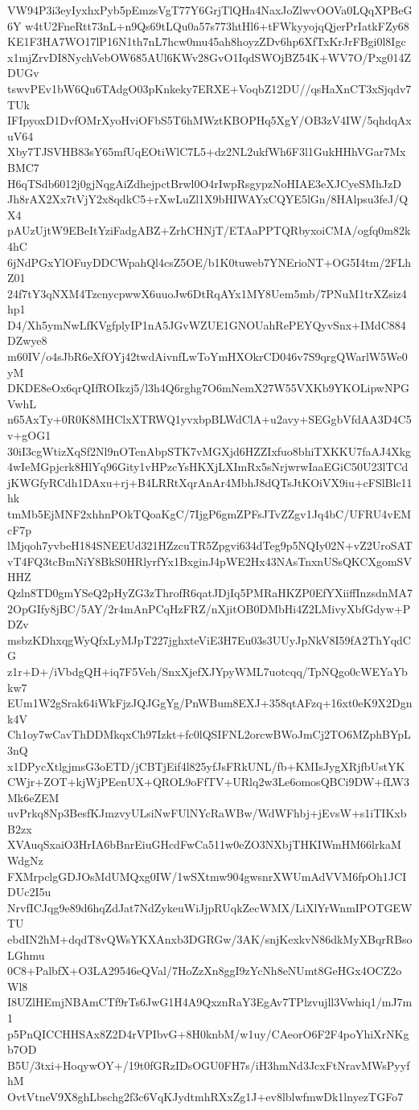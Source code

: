 VW94P3i3eyIyxhxPyb5pEmzsVgT77Y6GrjTlQHa4NaxJoZlwvOOVa0LQqXPBeG6Y
w4tU2FneRtt73nL+n9Qs69tLQu0a57s773htHl6+tFWkyyojqQjerPrIatkFZy68
KE1F3HA7WO17lP16N1th7nL7hcw0mu45ah8hoyzZDv6hp6XfTxKrJrFBgi0l8Igc
x1mjZrvDI8NychVebOW685AUl6KWv28GvO1IqdSWOjBZ54K+WV7O/Pxg014ZDUGv
tswvPEv1bW6Qu6TAdgO03pKnkeky7ERXE+VoqbZ12DU//qsHaXnCT3xSjqdv7TUk
IFIpyoxD1DvfOMrXyoHviOFbS5T6hMWztKBOPHq5XgY/OB3zV4IW/5qhdqAxuV64
Xby7TJSVHB83sY65mfUqEOtiWlC7L5+dz2NL2ukfWh6F3l1GukHHhVGar7MxBMC7
H6qTSdb6012j0gjNqgAiZdhejpctBrwl0O4rIwpRsgypzNoHIAE3eXJCyeSMhJzD
Jh8rAX2Xx7tVjY2x8qdkC5+rXwLuZl1X9bHIWAYxCQYE5lGn/8HAlpsu3feJ/QX4
pAUzUjtW9EBeItYziFadgABZ+ZrhCHNjT/ETAaPPTQRbyxoiCMA/ogfq0m82k4hC
6jNdPGxYlOFuyDDCWpahQl4csZ5OE/b1K0tuweb7YNErioNT+OG5I4tm/2FLhZ01
24f7tY3qNXM4TzcnycpwwX6uuoJw6DtRqAYx1MY8Uem5mb/7PNuM1trXZsiz4hp1
D4/Xh5ymNwLfKVgfplyIP1nA5JGvWZUE1GNOUahRePEYQyvSnx+IMdC884DZwye8
m60IV/o4sJbR6eXfOYj42twdAivnfLwToYmHXOkrCD046v7S9qrgQWarlW5We0yM
DKDE8eOx6qrQIfROIkzj5/l3h4Q6rghg7O6mNemX27W55VXKb9YKOLipwNPGVwhL
n65AxTy+0R0K8MHClxXTRWQ1yvxbpBLWdClA+u2avy+SEGgbVfdAA3D4C5v+gOG1
30iI3cgWtizXqSf2Nl9nOTenAbpSTK7vMGXjd6HZZIxfuo8bhiTXKKU7faAJ4Xkg
4wIeMGpjcrk8HlYq96Gity1vHPzcYsHKXjLXImRx5sNrjwrwIaaEGiC50U23lTCd
jKWGfyRCdh1DAxu+rj+B4LRRtXqrAnAr4MbhJ8dQTsJtKOiVX9iu+cFSlBlc11hk
tmMb5EjMNF2xhhnPOkTQoaKgC/7IjgP6gmZPFsJTvZZgv1Jq4bC/UFRU4vEMcF7p
lMjqoh7yvbeH184SNEEUd321HZzcuTR5Zpgvi634dTeg9p5NQIy02N+vZ2UroSAT
vT4FQ3tcBmNiY8BkS0HRlyrfYx1BxginJ4pWE2Hx43NAsTnxnUSsQKCXgomSVHHZ
Qzln8TD0gmYSeQ2pHyZG3zThrofR6qatJDjIq5PMRaHKZP0EfYXiiffInzsdnMA7
2OpGIfy8jBC/5AY/2r4mAnPCqHzFRZ/nXjitOB0DMbHi4Z2LMivyXbfGdyw+PDZv
msbzKDhxqgWyQfxLyMJpT227jghxteViE3H7Eu03s3UUyJpNkV8I59fA2ThYqdCG
z1r+D+/iVbdgQH+iq7F5Veh/SnxXjefXJYpyWML7uotcqq/TpNQgo0cWEYaYbkw7
EUm1W2gSrak64iWkFjzJQJGgYg/PnWBum8EXJ+358qtAFzq+16xt0eK9X2Dgnk4V
Ch1oy7wCavThDDMkqxCh97Izkt+fc0lQSIFNL2orcwBWoJmCj2TO6MZphBYpL3nQ
x1DPycXtlgjmsG3oETD/jCBTjEif4l825yfJsFRkUNL/fb+KMIsJygXRjfbUstYK
CWjr+ZOT+kjWjPEenUX+QROL9oFfTV+URlq2w3Le6omosQBCi9DW+fLW3Mk6eZEM
uvPrkq8Np3BesfKJmzvyULsiNwFUlNYcRaWBw/WdWFhbj+jEvsW+s1iTIKxbB2zx
XVAuqSxaiO3HrIA6bBnrEiuGHcdFwCa511w0eZO3NXbjTHKIWmHM66lrkaMWdgNz
FXMrpclgGDJOsMdUMQxg0IW/1wSXtmw904gwsnrXWUmAdVVM6fpOh1JCIDUc2I5u
NrvfICJqg9e89d6hqZdJat7NdZykeuWiJjpRUqkZecWMX/LiXlYrWnmIPOTGEWTU
ebdIN2hM+dqdT8vQWsYKXAnxb3DGRGw/3AK/snjKexkvN86dkMyXBqrRBsoLGhmu
0C8+PalbfX+O3LA29546eQVal/7HoZzXn8ggI9zYcNh8eNUmt8GeHGx4OCZ2oWl8
I8UZlHEmjNBAmCTf9rTs6JwG1H4A9QxznRaY3EgAv7TPlzvujll3Vwhiq1/mJ7m1
p5PnQICCHHSAx8Z2D4rVPIbvG+8H0knbM/w1uy/CAeorO6F2F4poYhiXrNKgb7OD
B5U/3txi+HoqywOY+/19t0fGRzIDsOGU0FH7s/iH3hmNd3JcxFtNravMWsPyyfhM
OvtVtneV9X8ghLbschg2f3c6VqKJydtmhRXxZg1J+ev8lblwfmwDk1lnyezTGFo7
